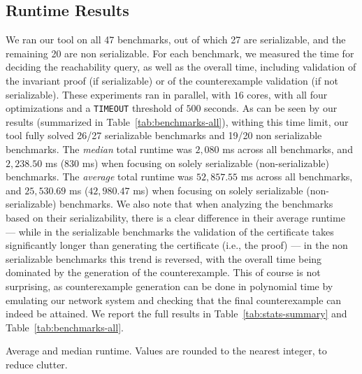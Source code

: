 \subsection{Runtime Results}
We ran our tool on all 47 benchmarks, out of which 27 are serializable, and the remaining 20 are non serializable. 
For each benchmark, we measured the time for deciding the reachability query, as well as the overall time, including validation of the invariant proof (if serializable) or of the counterexample validation (if not serializable). These experiments ran in parallel, with $16$ cores, with all four optimizations and a \texttt{TIMEOUT} threshold of $500$ seconds. As can be seen by our results (summarized in Table~\ref{tab:benchmarks-all}), withing this time limit, our tool fully solved 26/27 serializable benchmarks 
and 19/20 non serializable benchmarks. 
%
The \textit{median} total runtime was $2{,}080$ ms across all benchmarks, and $2{,}238.50$ ms ($830$ ms) when focusing on solely serializable (non-serializable) benchmarks.
%
The \textit{average} total runtime was $52{,}857.55$ ms across all benchmarks, and $25{,}530.69$ ms ($42{,}980.47$ ms) when focusing on solely serializable (non-serializable) benchmarks.
%
We also note that when analyzing the benchmarks based on their serializability, there is a clear difference in their average runtime --- while in the serializable benchmarks the validation of the certificate takes significantly longer than generating the certificate (i.e., the proof) --- in the non serializable benchmarks this trend is reversed, with the overall time being dominated by the generation of the counterexample. This of course is not surprising, as counterexample generation can be done in polynomial time by emulating our network system and checking that the final counterexample can indeed be attained.
%
We report the full results in Table~\ref{tab:stats-summary} and Table~\ref{tab:benchmarks-all}.





\begin{table}[H]
	\centering
	
\caption{Average and median runtime. Values are rounded to the nearest integer, to reduce clutter.}
\label{tab:stats-summary}
\end{table}





